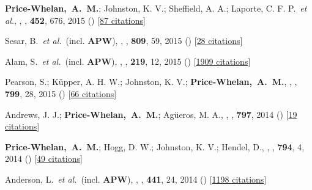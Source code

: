 \item[{\color{deemph}\scriptsize18}]\textbf{Price-Whelan,~A.~M.}; Johnston, K. V.; Sheffield, A. A.; Laporte, C. F. P.~\textit{et al.}, , \mnras, \textbf{452}, 676, 2015 () [\href{http://adsabs.harvard.edu/abs/2015MNRAS.452..676P}{87 citations}]

\item[{\color{deemph}\scriptsize17}]Sesar, B.~\textit{et al.}~(incl. \textbf{APW}), , \apj, \textbf{809}, 59, 2015 () [\href{http://adsabs.harvard.edu/abs/2015ApJ...809...59S}{28 citations}]

\item[{\color{deemph}\scriptsize16}]Alam, S.~\textit{et al.}~(incl. \textbf{APW}), , \apjs, \textbf{219}, 12, 2015 () [\href{http://adsabs.harvard.edu/abs/2015ApJS..219...12A}{1909 citations}]

\item[{\color{deemph}\scriptsize15}]Pearson, S.; K{\"u}pper, A. H. W.; Johnston, K. V.; \textbf{Price-Whelan,~A.~M.}, , \apj, \textbf{799}, 28, 2015 () [\href{http://adsabs.harvard.edu/abs/2015ApJ...799...28P}{66 citations}]

\item[{\color{deemph}\scriptsize14}]Andrews, J. J.; \textbf{Price-Whelan,~A.~M.}; Ag{\"u}eros, M. A., , \apj, \textbf{797}, 2014 () [\href{http://adsabs.harvard.edu/abs/2014ApJ...797L..32A}{19 citations}]

\item[{\color{deemph}\scriptsize13}]\textbf{Price-Whelan,~A.~M.}; Hogg, D. W.; Johnston, K. V.; Hendel, D., , \apj, \textbf{794}, 4, 2014 () [\href{http://adsabs.harvard.edu/abs/2014ApJ...794....4P}{49 citations}]

\item[{\color{deemph}\scriptsize12}]Anderson, L.~\textit{et al.}~(incl. \textbf{APW}), , \mnras, \textbf{441}, 24, 2014 () [\href{http://adsabs.harvard.edu/abs/2014MNRAS.441...24A}{1198 citations}]

